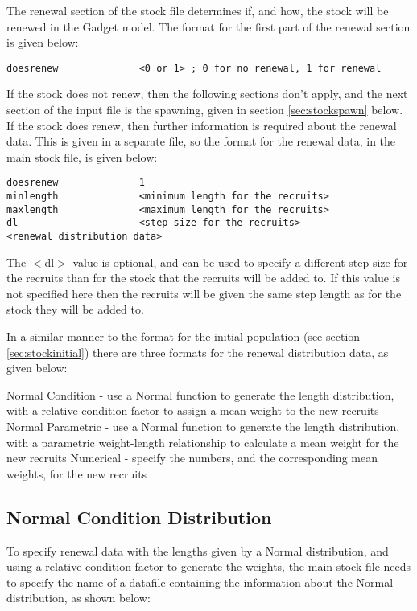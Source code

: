 \documentclass[]{book}
\begin{document}
The renewal section of the stock file determines if, and how, the stock
will be renewed in the Gadget model. The format for the first part of
the renewal section is given below:

\begin{verbatim}
doesrenew              <0 or 1> ; 0 for no renewal, 1 for renewal
\end{verbatim}

If the stock does not renew, then the following sections don't apply,
and the next section of the input file is the spawning, given in
section \ref{sec:stockspawn} below. If the stock does renew, then further
information is required about the renewal data. This is given in a
separate file, so the format for the renewal data, in the main stock
file, is given below:

\begin{verbatim}
doesrenew              1
minlength              <minimum length for the recruits>
maxlength              <maximum length for the recruits>
dl                     <step size for the recruits>
<renewal distribution data>
\end{verbatim}

The \(<\)dl\(>\) value is optional, and can be used to specify a different
step size for the recruits than for the stock that the recruits will be
added to. If this value is not specified here then the recruits will be
given the same step length as for the stock they will be added to.

In a similar manner to the format for the initial population (see
section \ref{sec:stockinitial}) there are three formats for the renewal
distribution data, as given below:

Normal Condition - use a Normal function to generate the length
distribution, with a relative condition factor to assign a mean weight
to the new recruits
Normal Parametric - use a Normal function to
generate the length distribution, with a parametric weight-length
relationship to calculate a mean weight for the new recruits Numerical -
specify the numbers, and the corresponding mean weights, for the new
recruits

\hypertarget{normal-condition-distribution-1}{%
\subsection{Normal Condition Distribution}\label{normal-condition-distribution-1}}

To specify renewal data with the lengths given by a Normal distribution,
and using a relative condition factor to generate the weights, the main
stock file needs to specify the name of a datafile containing the
information about the Normal distribution, as shown below:
\end{document}
